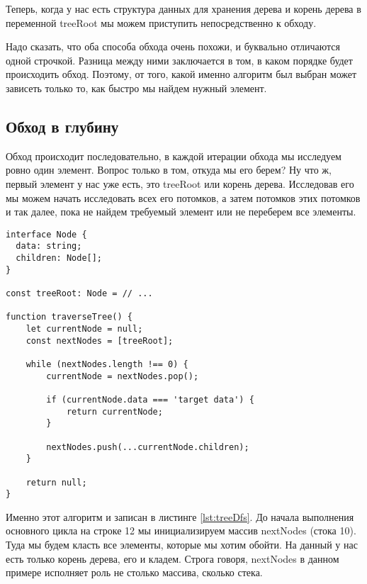 \documentclass[../article.tex]{subfiles}
\begin{document}
Теперь, когда у нас есть структура данных для хранения дерева и корень дерева в переменной {\firacodebold treeRoot} мы можем приступить непосредственно к обходу.

Надо сказать, что оба способа обхода очень похожи, и буквально отличаются одной строчкой. Разница между ними заключается в том, в каком порядке будет происходить обход. Поэтому, от того, какой именно алгоритм был выбран может зависеть только то, как быстро мы найдем нужный элемент.

\subsection{Обход в глубину}

Обход происходит последовательно, в каждой итерации обхода мы исследуем ровно один элемент. Вопрос только в том, откуда мы его берем? Ну что ж, первый элемент у нас уже есть, это {\firacodebold treeRoot} или корень дерева. Исследовав его мы можем начать исследовать всех его потомков, а затем потомков этих потомков и так далее, пока не найдем требуемый элемент или не переберем все элементы.

\begin{strip}
    \begin{topruledelement}
        \begin{lstlisting}[caption={Обход дерева в глубину}, label={lst:treeDfs}]
interface Node {
  data: string;
  children: Node[];
}

const treeRoot: Node = // ...

function traverseTree() {
    let currentNode = null;
    const nextNodes = [treeRoot];

    while (nextNodes.length !== 0) {
        currentNode = nextNodes.pop();

        if (currentNode.data === 'target data') {
            return currentNode;
        }

        nextNodes.push(...currentNode.children);
    }

    return null;
}

        \end{lstlisting}
    \end{topruledelement}
\end{strip}

Именно этот алгоритм и записан в листинге \ref{lst:treeDfs}. До начала выполнения основного цикла на строке 12 мы инициализируем массив {\firacodebold nextNodes} (стока 10). Туда мы будем класть все элементы, которые мы хотим обойти. На данный у нас есть только корень дерева, его и кладем. Строга говоря, {\firacodebold nextNodes} в данном примере исполняет роль не столько массива, сколько {\firacodebold стека}.
\end{document}
